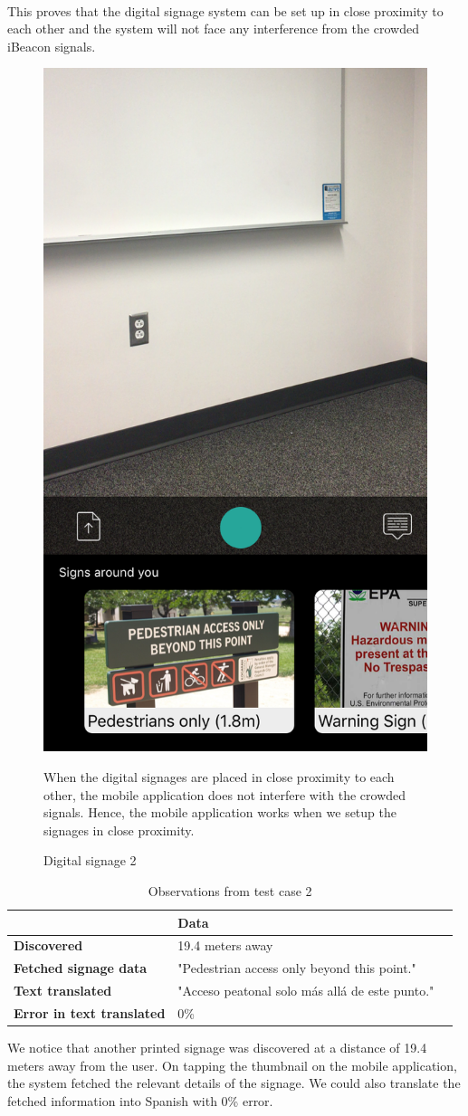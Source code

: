 \documentclass[12pt]{article}
\begin{document}
\paragraph{}This proves that the digital signage system can be set up in close proximity to each other and the system will not face any interference from the crowded iBeacon signals. 

       \begin{figure}[H]
	\centering
	\includegraphics[width=0.5\linewidth]{media/case1.png}
	\caption{Digital signage 2} {When the digital signages are placed in close proximity to each other, the mobile application does not interfere with the crowded signals. Hence, the mobile application works when we setup the signages in close proximity.}
	\label{fig:eng}
\end{figure} 

\begin{table}%
    \centering
   
    \label{my-label}
       \begin{tabular}{|p{30mm}|p{55mm}|p{35mm}|}
 \hline
  & \textbf{Data}  \\ [0.5ex] 
 \hline\hline
 \textbf{Discovered} & 19.4 meters away  \\ 
 \hline
 \textbf{Fetched signage data} & "Pedestrian access only beyond this point."  \\
 \hline
 \textbf{Text translated} &  "Acceso peatonal solo más allá de este punto." \\
 \hline
 \textbf{Error in text translated} & 0\%   \\ [1ex] 
 \hline
    \end{tabular}
     \caption{Observations from test case 2} {We notice that another printed signage was discovered at a distance of 19.4 meters away from the user. On tapping the thumbnail on the mobile application, the system fetched the relevant details of the signage. We could also translate the fetched information into Spanish with 0\% error.}
\end{table}
\end{document}
